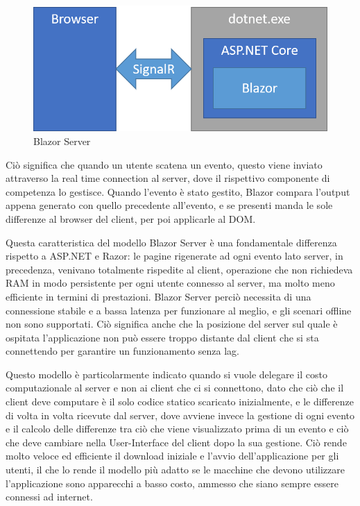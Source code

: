 \begin{figure}[H]
	\centerline{\includegraphics[scale=0.6]{figure/blazor-server.png}}
	\caption{Blazor Server}
	\label{fig:BlazorServer}
\end{figure}

Ci\`o significa che quando un utente scatena un evento, questo viene inviato attraverso la real time connection al server, dove il rispettivo componente di competenza lo gestisce.
Quando l'evento \`e stato gestito, Blazor compara l'output appena generato con quello precedente all'evento, e se presenti manda le sole differenze al browser del client, per poi applicarle al DOM\cite{blazorModelsScenarios}.

Questa caratteristica del modello Blazor Server \`e una fondamentale differenza rispetto a ASP.NET e Razor: le pagine rigenerate ad ogni evento lato server, in precedenza, venivano totalmente rispedite al client, operazione che non richiedeva RAM in modo persistente per ogni utente connesso al server, ma molto meno efficiente in termini di prestazioni.
Blazor Server perci\`o necessita di una connessione stabile e a bassa latenza per funzionare al meglio, e gli scenari offline non sono supportati.
Ci\`o significa anche che la posizione del server sul quale \`e ospitata l'applicazione non pu\`o essere troppo distante dal client che si sta connettendo per garantire un funzionamento senza lag.

Questo modello \`e particolarmente indicato quando si vuole delegare il costo computazionale al server e non ai client che ci si connettono, dato che ci\`o che il client deve computare \`e il solo codice statico scaricato inizialmente, e le differenze di volta in volta ricevute dal server, dove avviene invece la gestione di ogni evento e il calcolo delle differenze tra ci\`o che viene visualizzato prima di un evento e ci\`o che deve cambiare nella User-Interface del client dopo la sua gestione.
Ci\`o rende molto veloce ed efficiente il download iniziale e l'avvio dell'applicazione per gli utenti, il che lo rende il modello pi\`u adatto se le macchine che devono utilizzare l'applicazione sono apparecchi a basso costo, ammesso che siano sempre essere connessi ad internet.


